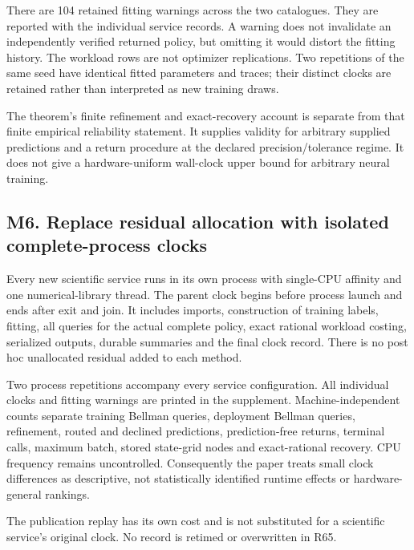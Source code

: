There are 104 retained fitting warnings across the two catalogues. They
are reported with the individual service records. A warning does not
invalidate an independently verified returned policy, but omitting it
would distort the fitting history. The workload rows are not optimizer
replications. Two repetitions of the same seed have identical fitted
parameters and traces; their distinct clocks are retained rather than
interpreted as new training draws.

The theorem's finite refinement and exact-recovery account is separate
from that finite empirical reliability statement. It supplies validity
for arbitrary supplied predictions and a return procedure at the
declared precision/tolerance regime. It does not give a hardware-uniform
wall-clock upper bound for arbitrary neural training.

\hypertarget{m6.-replace-residual-allocation-with-isolated-complete-process-clocks}{%
\subsection{M6. Replace residual allocation with isolated
complete-process
clocks}\label{m6.-replace-residual-allocation-with-isolated-complete-process-clocks}}

Every new scientific service runs in its own process with single-CPU
affinity and one numerical-library thread. The parent clock begins
before process launch and ends after exit and join. It includes imports,
construction of training labels, fitting, all queries for the actual
complete policy, exact rational workload costing, serialized outputs,
durable summaries and the final clock record. There is no post hoc
unallocated residual added to each method.

Two process repetitions accompany every service configuration. All
individual clocks and fitting warnings are printed in the supplement.
Machine-independent counts separate training Bellman queries, deployment
Bellman queries, refinement, routed and declined predictions,
prediction-free returns, terminal calls, maximum batch, stored
state-grid nodes and exact-rational recovery. CPU frequency remains
uncontrolled. Consequently the paper treats small clock differences as
descriptive, not statistically identified runtime effects or
hardware-general rankings.

The publication replay has its own cost and is not substituted for a
scientific service's original clock. No record is retimed or overwritten
in R65.

